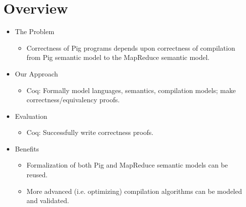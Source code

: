 \section*{Overview}

\begin{frame}
\begin{itemize}

  \item The Problem
  \begin{itemize}
    \item Correctness of Pig programs depends upon correctness of compilation
          from Pig semantic model to the MapReduce semantic model.
  \end{itemize}

  \item Our Approach
  \begin{itemize}
    \item Coq: Formally model languages, semantics, compilation models; make
          correctness/equivalency proofs.
  \end{itemize}

  \item Evaluation
  \begin{itemize}
    \item Coq: Successfully write correctness proofs.
  \end{itemize}

  \item Benefits
  \begin{itemize}
    \item Formalization of both Pig and MapReduce semantic models can be reused.
    \item More advanced (i.e. optimizing) compilation algorithms can be modeled
          and validated.
  \end{itemize}

\end{itemize}
\end{frame}
